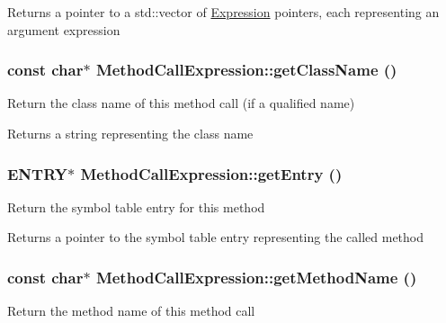 \begin{DoxyReturn}{Returns}
a pointer to a std::vector of \hyperlink{classExpression}{Expression} pointers, each representing an argument expression 
\end{DoxyReturn}
\hypertarget{classMethodCallExpression_aac842be4123a65f75e09dad4369fcdb2}{
\subsubsection[{getClassName}]{\setlength{\rightskip}{0pt plus 5cm}const char$\ast$ MethodCallExpression::getClassName ()}}
\label{classMethodCallExpression_aac842be4123a65f75e09dad4369fcdb2}
Return the class name of this method call (if a qualified name)

\begin{DoxyReturn}{Returns}
a string representing the class name 
\end{DoxyReturn}
\hypertarget{classMethodCallExpression_acba6b59d3a951124c09bc8222dea1b82}{
\subsubsection[{getEntry}]{\setlength{\rightskip}{0pt plus 5cm}ENTRY$\ast$ MethodCallExpression::getEntry ()}}
\label{classMethodCallExpression_acba6b59d3a951124c09bc8222dea1b82}
Return the symbol table entry for this method

\begin{DoxyReturn}{Returns}
a pointer to the symbol table entry representing the called method 
\end{DoxyReturn}
\hypertarget{classMethodCallExpression_a53338c550e4f939f8c263f08a52ec8f5}{
\subsubsection[{getMethodName}]{\setlength{\rightskip}{0pt plus 5cm}const char$\ast$ MethodCallExpression::getMethodName ()}}
\label{classMethodCallExpression_a53338c550e4f939f8c263f08a52ec8f5}
Return the method name of this method call

